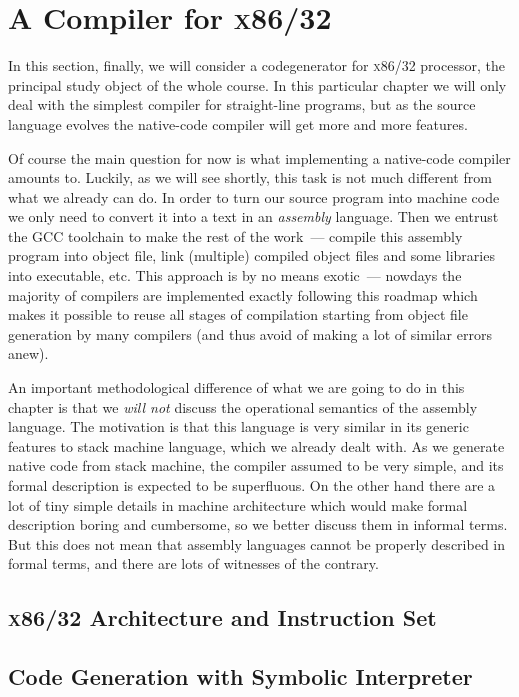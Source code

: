\chapter{A Compiler for \textsc{x86/32}}

In this section, finally, we will consider a codegenerator for \textsc{x86/32} processor, the principal study object of the whole course. In this particular chapter we will only deal with the simplest compiler for straight-line programs, but as the source language evolves the native-code compiler will get more and more features.

Of course the main question for now is what implementing a native-code compiler amounts to. Luckily, as we will see shortly, this task is not much different from what we already can do. In order to turn our source program into machine code we only need to convert it into a text in an \emph{assembly} language. Then we entrust the \textsc{GCC} toolchain to make the rest of the work~--- compile this assembly program into object file, link (multiple) compiled object files and some libraries into executable, etc. This approach is by no means exotic~--- nowdays the majority of compilers are implemented exactly following this roadmap which makes it possible to reuse all stages of compilation starting from object file generation by many compilers (and thus avoid of making a lot of similar errors anew).

An important methodological difference of what we are going to do in this chapter is that we \emph{will not} discuss the operational semantics of the assembly language. The motivation is that this language is very similar in its generic features to stack machine language, which we already dealt with. As we generate native code from stack machine, the compiler assumed to be very simple, and its formal description is expected to be superfluous. On the other hand there are a lot of tiny simple details in machine architecture which would make formal description boring and cumbersome, so we better discuss them in informal terms. But this does not mean that assembly languages cannot be properly described in formal terms, and there are lots of witnesses of the contrary.

\section{\textsc{x86/32} Architecture and Instruction Set}

\section{Code Generation with Symbolic Interpreter}

\section{}


